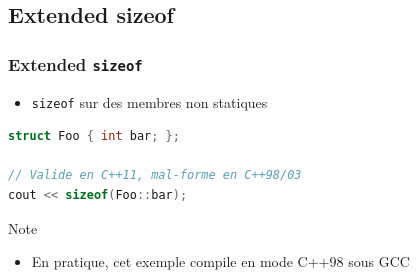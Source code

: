 \documentclass[C++.tex]{subfiles}
\begin{document}
\subsection*{Extended sizeof}
\begin{frame}[fragile]
	\frametitle{Extended \lstinline|sizeof|}
	\begin{itemize}
		\item \lstinline|sizeof| sur des membres non statiques
	\end{itemize}

	\begin{lstlisting}[language=C++]
struct Foo { int bar; };

// Valide en C++11, mal-forme en C++98/03
cout << sizeof(Foo::bar); \end{lstlisting}


	\begin{block}{Note}
		\begin{itemize}
			\item En pratique, cet exemple compile en mode C++98 sous GCC
		\end{itemize}

	\end{block}
\end{frame}
\end{document}
